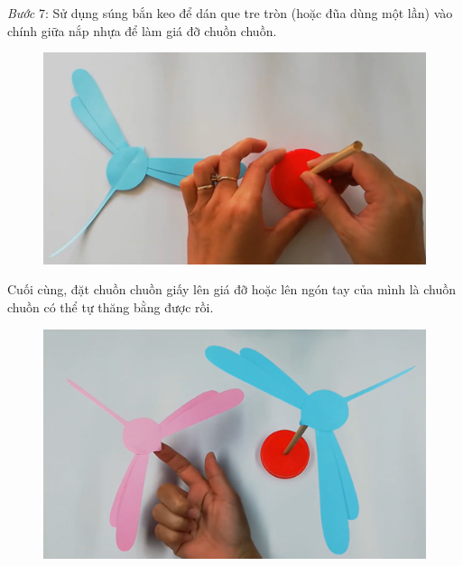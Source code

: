 \begin{multicols}{2}
\begin{figure}[H]
		\vspace*{-10pt}
	\end{figure}
	\textit{Bước} $7$: Sử dụng súng bắn keo để dán que tre tròn (hoặc đũa dùng một lần) vào chính giữa nắp nhựa để làm giá đỡ chuồn chuồn.
	\begin{figure}[H]
		\vspace*{-5pt}
		\centering
		\captionsetup{labelformat= empty, justification=centering}
		\includegraphics[width=0.7\linewidth]{74}
		\vspace*{-10pt}
	\end{figure}
	Cuối cùng, đặt chuồn chuồn giấy lên giá đỡ hoặc lên ngón tay của mình là chuồn chuồn có thể tự thăng bằng được rồi.
	\begin{figure}[H]
		\vspace*{-5pt}
		\centering
		\captionsetup{labelformat= empty, justification=centering}
		\includegraphics[width=0.7\linewidth]{75}
		\vspace*{-10pt}
	\end{figure}
\end{multicols}

